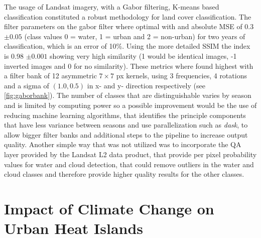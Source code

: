 \documentclass[12pt,a4paper, english,twoside]{article}
\begin{document}
    The usage of Landsat imagery, with a Gabor filtering, K-means based classification constituted a robust methodology for land cover classification.
    The filter parameters on the gabor filter where optimal with and absolute MSE of 0.3 $\pm 0.05$ (class values 0 = water, 1 = urban and 2 = non-urban) for two years of classification, which is an error of 10\%.
    Using the more detailed \gls{SSIM} the index is 0.98 $\pm 0.001$ showing very high similarity (1 would be identical images, -1 inverted images and 0 for no similarity). 
    These metrics where found highest with a filter bank of 12 asymmetric $7\times7$ px kernels, using 3 frequencies, 4 rotations and a sigma of $(1.0,0.5)$ in x- and y- direction respectively (see \cref{fig:gaborbank}).
    \todo[inline,size=\tiny]{}
    The number of classes that are distinguishable varies by season and is limited by computing power so a possible improvement would be the use of reducing machine learning algorithms, that identifies the principle components that have less variance between seasons and use parallelization such as \textit{dask}\autocite{dask}, to allow bigger filter banks and additional steps to the pipeline to increase output quality.
    Another simple way that was not utilized was to incorporate the QA layer provided by the Landsat L2 data product, that provide per pixel probability values for water and cloud detection, that could remove outliers in the water and cloud classes and therefore provide higher quality results for the other classes. 
    
  \newpage
  \section{Impact of Climate Change on Urban Heat Islands}\label{sec:UHITempImp}
\end{document}
